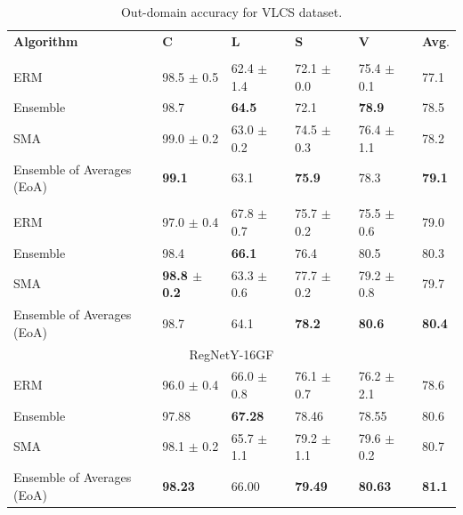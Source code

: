 \begin{table}[]
\centering
\caption{Out-domain accuracy for VLCS dataset.}
\begin{tabular}{lllll|l}
\hline
\textbf{Algorithm}          & \textbf{C}           & \textbf{L}           & \textbf{S}     & \textbf{V}    & \textbf{Avg}. \\ \hhline{=====|=}
\multicolumn{6}{c}{{ResNet-50}}\\
\hline
ERM & 98.5 $\pm$ 0.5           & 62.4 $\pm$ 1.4           & 72.1 $\pm$ 0.0          & 75.4 $\pm$ 0.1         & 77.1\\
Ensemble & 98.7             & \textbf{64.5}           &       72.1         & \textbf{78.9} &   78.5  \\
\hline
\rowcolor{Gray}
SMA & 99.0 $\pm$ 0.2           & 63.0 $\pm$ 0.2           & 74.5 $\pm$ 0.3          & 76.4 $\pm$ 1.1         & 78.2\\
 \rowcolor{Gray}
Ensemble of Averages (EoA) & \textbf{99.1}           & 63.1           & \textbf{75.9}           &        78.3        & \textbf{79.1}\\ 
\hhline{=====|=}
\multicolumn{6}{c}{{ResNeXt-50 32x4d  \cite{yalniz2019billion}}}\\
\hline
ERM & 97.0 $\pm$ 0.4 & 67.8 $\pm$ 0.7 & 75.7 $\pm$ 0.2 & 75.5 $\pm$ 0.6 & 79.0 \\ %
Ensemble & 98.4             & \textbf{66.1}                 & 76.4           &          {80.5}      &   80.3   \\
\hline
\rowcolor{Gray}
SMA    & \textbf{98.8 $\pm$ 0.2} & 63.3 $\pm$ 0.6   & 77.7 $\pm$ 0.2  & 79.2 $\pm$ 0.8 & 79.7 \\ 
 \rowcolor{Gray}
Ensemble of Averages (EoA) & 98.7           & 64.1      & \textbf{78.2}   &  \textbf{80.6}   & \textbf{80.4} \\
\hline
\multicolumn{6}{c}{{RegNetY-16GF \cite{singh2022revisiting}}}\\
\hline
ERM & 96.0 $\pm$ 0.4 & 66.0 $\pm$ 0.8  & 76.1 $\pm$ 0.7 & 76.2 $\pm$ 2.1 & 78.6 \\ %
Ensemble &       97.88     &       \textbf{67.28}       &    78.46        &       78.55        &   80.6   \\
\hline
\rowcolor{Gray}
SMA    & 98.1 $\pm$ 0.2 & 65.7 $\pm$ 1.1  & 79.2 $\pm$ 1.1 & 79.6 $\pm$ 0.2  & 80.7\\ 
 \rowcolor{Gray}
Ensemble of Averages (EoA) &     \textbf{98.23}     &    66.00 & \textbf{79.49}   &  \textbf{80.63}   & \textbf{81.1} \\
\hline
\end{tabular}
\label{tab:vlcs_perf}
\end{table}


